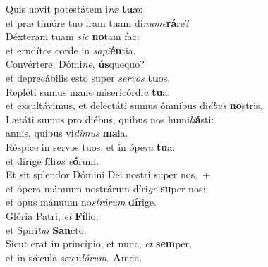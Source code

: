 \oddverse Quis novit potestátem i\textit{ræ} \textbf{tu}æ:~\*\\
\oddverse et præ timóre tuo iram tuam di\textit{nu}\textit{me}\textbf{rá}re?\\
\evenverse Déxteram tuam \textit{sic} \textbf{no}tam fac:~\*\\
\evenverse et erudítos corde in \textit{sa}\textit{pi}\textbf{én}tia.\\
\oddverse Convértere, Dómi\textit{ne}, \textbf{ús}quequo?~\*\\
\oddverse et deprecábilis esto super \textit{ser}\textit{vos} \textbf{tu}os.\\
\evenverse Repléti sumus mane misericórdi\textit{a} \textbf{tu}a:~\*\\
\evenverse et exsultávimus, et delectáti sumus ómnibus di\textit{é}\textit{bus} \textbf{no}stris.\\
\oddverse Lætáti sumus pro diébus, quibus nos humi\textit{li}\textbf{á}sti:~\*\\
\oddverse annis, quibus ví\textit{di}\textit{mus} \textbf{ma}la.\\
\evenverse Réspice in servos tuos, et in ópe\textit{ra} \textbf{tu}a:~\*\\
\evenverse et dírige fíli\textit{os} \textit{e}\textbf{ó}rum.\\
\oddverse Et sit splendor Dómini Dei nostri super nos,~+\\
\oddverse  et ópera mánuum nostrárum díri\textit{ge} \textbf{su}per nos:~\*\\
\oddverse et opus mánuum no\textit{strá}\textit{rum} \textbf{dí}rige.\\
\evenverse Glória Patri, \textit{et} \textbf{Fí}lio,~\*\\
\evenverse et Spirí\textit{tu}\textit{i} \textbf{San}cto.\\
\oddverse Sicut erat in princípio, et nunc, \textit{et} \textbf{sem}per,~\*\\
\oddverse et in sǽcula sæcu\textit{ló}\textit{rum}. \textbf{A}men.\\
